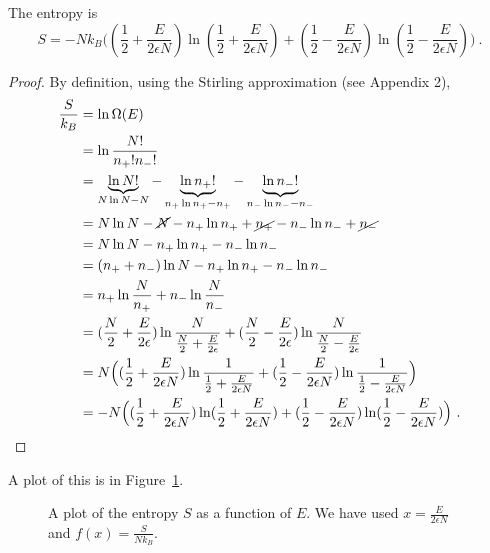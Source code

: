     The entropy is 
    \begin{equation*}
        S = - N k_B \Big ( (\frac{1}{2} + \frac{E}{2\epsilon N}) \ln (\frac{1}{2} + \frac{E}{2\epsilon N} ) + (\frac{1}{2} - \frac{E}{2\epsilon N}) \ln (\frac{1}{2} - \frac{E}{2\epsilon N} ) \Big ) ~.
    \end{equation*}
    \begin{proof}
        By definition, using the Stirling approximation (see Appendix 2),
        \begin{equation*}
        \begin{aligned}
            \frac{S}{k_B} & = \ln \Omega (E) \\ & = \ln \frac{N!}{n_+! n_-!} \\ & = \underbrace{\ln N!}_{N \ln N - N} - \underbrace{\ln n_+!}_{n_+ \ln n_+ - n_+} - \underbrace{\ln n_-!}_{n_- \ln n_- - n_-} \\ & = N \ln N - \cancel{N} - n_+ \ln n_+ + \cancel{n_+} - n_- \ln n_- + \cancel{n_-} \\ & = N \ln N - n_+ \ln n_+ - n_- \ln n_- \\ & = (n_+ + n_-) \ln N - n_+ \ln n_+ - n_- \ln n_- \\ & = n_+ \ln \frac{N}{n_+} + n_- \ln \frac{N}{n_-} \\ & = (\frac{N}{2} + \frac{E}{2\epsilon}) \ln \frac{N}{\frac{N}{2} + \frac{E}{2\epsilon}} + (\frac{N}{2} - \frac{E}{2\epsilon}) \ln \frac{N}{\frac{N}{2} - \frac{E}{2\epsilon}} \\ & = N \Big ( (\frac{1}{2} + \frac{E}{2\epsilon N}) \ln \frac{1}{\frac{1}{2} + \frac{E}{2\epsilon N}} + (\frac{1}{2} - \frac{E}{2\epsilon N}) \ln \frac{1}{\frac{1}{2} - \frac{E}{2\epsilon N}} \Big ) \\ & = - N \Big ( (\frac{1}{2} + \frac{E}{2\epsilon N}) \ln (\frac{1}{2} + \frac{E}{2\epsilon N} ) + (\frac{1}{2} - \frac{E}{2\epsilon N}) \ln (\frac{1}{2} - \frac{E}{2\epsilon N} )\Big ) ~.
        \end{aligned}
        \end{equation*}
    \end{proof}
    A plot of this is in Figure~\ref{en:s}.
    \begin{figure}
        \centering
        \caption{A plot of the entropy $S$ as a function of $E$. We have used $x = \frac{E}{2 \epsilon N} $ and $f(x) = \frac{S}{N k_B}$.}
        \label{en:s}
    \end{figure}

